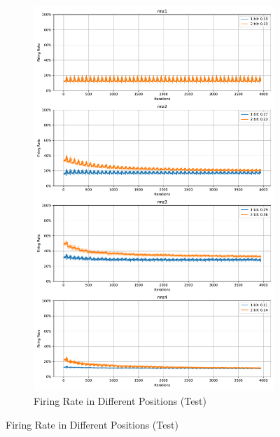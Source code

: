         \begin{figure}[H]
            \centering
            \ContinuedFloat
            \begin{subfigure}[H]{0.8\textwidth}
                \centering
                \includegraphics[width=\textwidth]{../firerate/MNIST/plots/mnist_test_firerate.pdf}
                \caption{Firing Rate in Different Positions (Test)}
            \end{subfigure}
        \end{figure}

